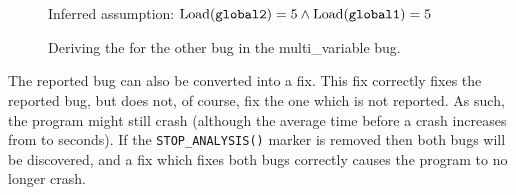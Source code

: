 \begin{figure}
  \hfill
  \\
  \\
  Inferred assumption: $\mathrm{Load}(\texttt{global2}) = 5 \wedge \mathrm{Load}(\texttt{global1}) = 5$
  \caption{Deriving the  for the other bug in the multi\_variable bug.}
  \label{fig:eval:multi_variable:other_bug}
\end{figure}

The reported bug can also be converted into a fix.  This fix correctly
fixes the reported bug, but does not, of course, fix the one which is
not reported.  As such, the program might still crash (although the
average time before a crash increases from  to 
seconds).  If the \texttt{STOP\_ANALYSIS()} marker is removed then
both bugs will be discovered, and a fix which fixes both bugs
correctly causes the program to no longer crash.  

